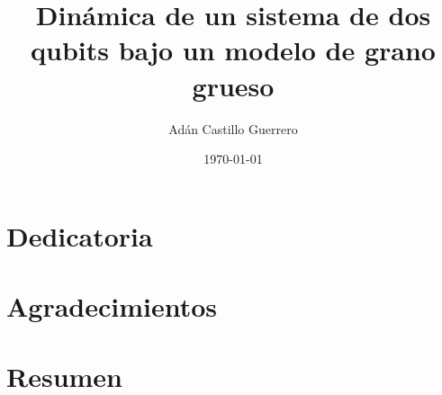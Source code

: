 \documentclass[12pt,twoside]{book}
\title{Dinámica de un sistema de dos qubits bajo un modelo de grano grueso}
\author{Adán Castillo Guerrero}
\date{\today}
\begin{document}
\maketitle
\cleardoublepage

\section*{Dedicatoria}

\cleardoublepage

\section*{Agradecimientos}
\cleardoublepage

\section*{Resumen}

\pagestyle{plain}
\tableofcontents
\newpage
\listoffigures
\newpage
\listoftables




\appendix



\end{document}
